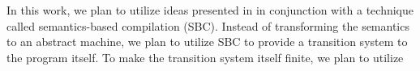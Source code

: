 In this work, we plan to utilize ideas presented in \cite{KoppelICFP22}
in conjunction with a technique called semantics-based compilation (SBC).
Instead of transforming the semantics to an abstract machine, we plan
to utilize SBC to provide a transition system  to the
program itself. To make the transition system itself finite, we plan
to utilize







%
%

